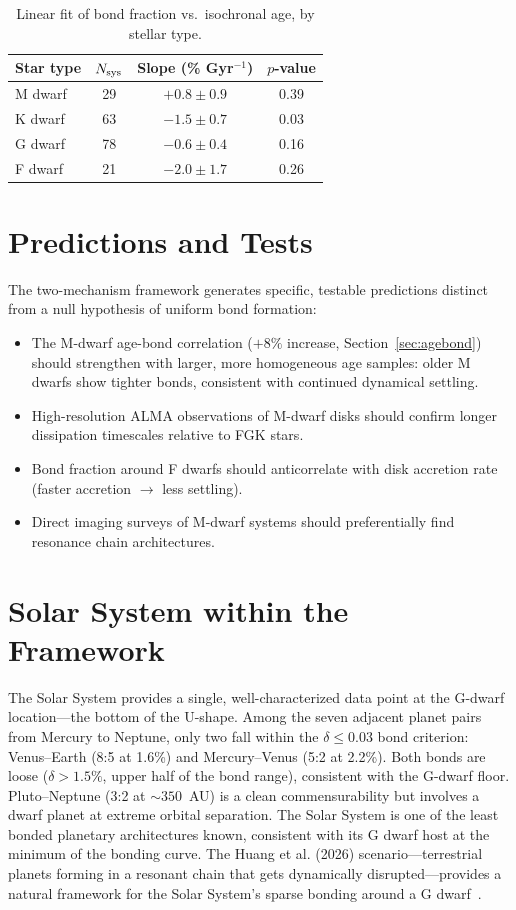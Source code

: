 \documentclass[twocolumn,usenatbib]{mnras}
\begin{document}
\begin{table}
\centering
\caption{Linear fit of bond fraction vs.\ isochronal age, by stellar type.}
\label{tab:agebond}
\begin{tabular}{lccc}
\hline
Star type & $N_{\rm sys}$ & Slope (\% Gyr$^{-1}$) & $p$-value\\
\hline
M dwarf & 29 & $+0.8 \pm 0.9$ & 0.39\\
K dwarf & 63 & $-1.5 \pm 0.7$ & 0.03\\
G dwarf & 78 & $-0.6 \pm 0.4$ & 0.16\\
F dwarf & 21 & $-2.0 \pm 1.7$ & 0.26\\
\hline
\end{tabular}
\end{table}

\section{Predictions and Tests}

The two-mechanism framework generates specific, testable predictions distinct
from a null hypothesis of uniform bond formation:
\begin{itemize}
  \item The M-dwarf age-bond correlation ($+8\%$ increase,
        Section~\ref{sec:agebond}) should strengthen with larger, more
        homogeneous age samples: older M dwarfs show tighter bonds, consistent
        with continued dynamical settling.
  \item High-resolution ALMA observations of M-dwarf disks should confirm
        longer dissipation timescales relative to FGK stars.
  \item Bond fraction around F dwarfs should anticorrelate with disk accretion
        rate (faster accretion $\rightarrow$ less settling).
  \item Direct imaging surveys of M-dwarf systems should preferentially find
        resonance chain architectures.
\end{itemize}

\section{Solar System within the Framework}

The Solar System provides a single, well-characterized data point at the
G-dwarf location---the bottom of the U-shape. Among the seven adjacent
planet pairs from Mercury to Neptune, only two fall within the
$\delta \leq 0.03$ bond criterion: Venus--Earth (8:5 at 1.6\%) and
Mercury--Venus (5:2 at 2.2\%). Both bonds are loose ($\delta > 1.5\%$,
upper half of the bond range), consistent with the G-dwarf floor.
Pluto--Neptune (3:2 at $\sim 350$~AU) is a clean commensurability but
involves a dwarf planet at extreme orbital separation. The Solar System
is one of the least bonded planetary architectures known, consistent with
its G dwarf host at the minimum of the bonding curve. The Huang et al.
(2026) scenario---terrestrial planets forming in a resonant chain that gets
dynamically disrupted---provides a natural framework for the Solar System's
sparse bonding around a G dwarf~\citep{hu2025}.
\end{document}
